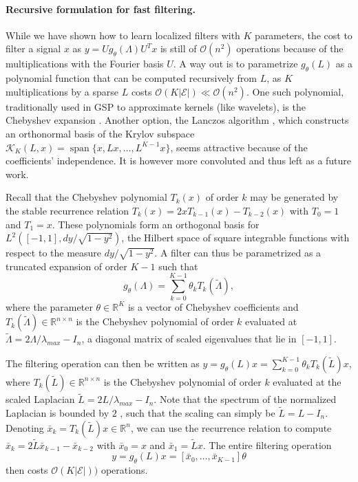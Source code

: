 \documentclass{article}
\DeclareMathOperator*{\spn}{span}
\newcommand{\E}{\mathcal{E}}
\newcommand{\bO}{\mathcal{O}}
\newcommand{\R}{\mathbb{R}}
\begin{document}
\paragraph{Recursive formulation for fast filtering.} While we have shown how to
learn localized filters with $K$ parameters, the cost to filter a signal $x$ as
$y = Ug_\theta(\Lambda)U^Tx$ is still of $\bO(n^2)$ operations because of the
multiplications with the Fourier basis $U$. A way out is to parametrize
$g_\theta(L)$ as a polynomial function that can be computed recursively from
$L$, as $K$ multiplications by a sparse $L$ costs $\bO(K|\E|) \ll \bO(n^2)$. One
such polynomial, traditionally used in GSP to approximate kernels (like
wavelets), is the Chebyshev expansion
\cite{art:HammondVandergheynstGribonval11GraphWav}. Another option, the Lanczos
algorithm \cite{art:SusnjaraPerraudinKressnerVandergheynst15Lanczos}, which
constructs an orthonormal basis of the Krylov subspace $\mathcal{K}_K(L,x) =
\spn\{x,Lx,\ldots,L^{K-1}x\}$, seems attractive because of the coefficients'
independence. It is however more convoluted and thus left as a future work.

Recall that the Chebyshev polynomial $T_k(x)$ of order $k$ may be generated by
the stable recurrence relation $T_k(x) = 2x T_{k-1}(x) - T_{k-2}(x)$ with $T_0 =
1$ and $T_1 = x$. These polynomials form an orthogonal basis for $L^2([-1,1], dy
/ \sqrt{1-y^2})$, the Hilbert space of square integrable functions with respect
to the measure $dy/\sqrt{1-y^2}$. A filter can thus be parametrized as a
truncated expansion of order $K-1$ such that
\begin{equation} \label{eq:filt_cheby}
	g_\theta(\Lambda) = \sum_{k=0}^{K-1} \theta_k T_k(\tilde{\Lambda}),
\end{equation}
where the parameter $\theta \in \R^K$ is a vector of Chebyshev coefficients and
$T_k(\tilde{\Lambda}) \in \R^{n \times n}$ is the Chebyshev polynomial of order
$k$ evaluated at $\tilde{\Lambda} = 2 \Lambda / \lambda_{max} - I_n$, a diagonal
matrix of scaled eigenvalues that lie in $[-1,1]$.

The filtering operation can then be written as $y = g_\theta(L) x
= \sum_{k=0}^{K-1} \theta_k T_k(\tilde{L}) x$, where $T_k(\tilde{L}) \in \R^{n
\times n}$ is the Chebyshev polynomial of order $k$ evaluated at the scaled
Laplacian $\tilde{L} = 2 L / \lambda_{max} - I_n$. Note that the spectrum of the
normalized Laplacian is bounded by $2$ \cite{book:Chung97Spectral}, such that
the scaling can simply be $\tilde{L} = L - I_n$. Denoting $\bar{x}_k =
T_k(\tilde{L})x \in \R^n$, we can use the recurrence relation to compute
$\bar{x}_k = 2\tilde{L} \bar{x}_{k-1} - \bar{x}_{k-2}$ with $\bar{x}_0 = x$ and
$\bar{x}_1 = \tilde{L}x$. The entire filtering operation
\begin{equation}
	y = g_\theta(L) x = [\bar{x}_0, \ldots, \bar{x}_{K-1}] \theta
\end{equation}
then costs $\bO(K|\E|))$ operations.
\end{document}
